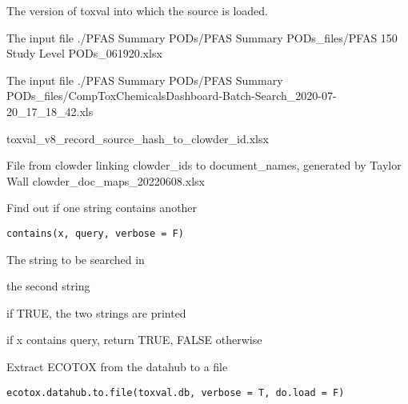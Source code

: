\documentclass[letterpaper]{book}
\begin{document}
\begin{Arguments}
\begin{ldescription}
\item[\code{db}] The version of toxval into which the source is loaded.

\item[\code{infile1}] The input file ./PFAS Summary PODs/PFAS Summary PODs\_files/PFAS 150 Study Level PODs\_061920.xlsx

\item[\code{infile2}] The input file ./PFAS Summary PODs/PFAS Summary PODs\_files/CompToxChemicalsDashboard-Batch-Search\_2020-07-20\_17\_18\_42.xls


toxval\_v8\_record\_source\_hash\_to\_clowder\_id.xlsx

File from clowder linking clowder\_ids to document\_names, generated by Taylor Wall
clowder\_doc\_maps\_20220608.xlsx
\end{ldescription}
\end{Arguments}
%
\begin{Description}\relax
Find out if one string contains another
\end{Description}
%
\begin{Usage}
\begin{verbatim}
contains(x, query, verbose = F)
\end{verbatim}
\end{Usage}
%
\begin{Arguments}
\begin{ldescription}
\item[\code{x}] The string to be searched in

\item[\code{query}] the second string

\item[\code{verbose}] if TRUE, the two strings are printed
\end{ldescription}
\end{Arguments}
%
\begin{Value}
if x contains query, return TRUE, FALSE otherwise
\end{Value}
%
\begin{Description}\relax
Extract ECOTOX from the datahub to a file
\end{Description}
%
\begin{Usage}
\begin{verbatim}
ecotox.datahub.to.file(toxval.db, verbose = T, do.load = F)
\end{verbatim}
\end{Usage}
\end{document}
